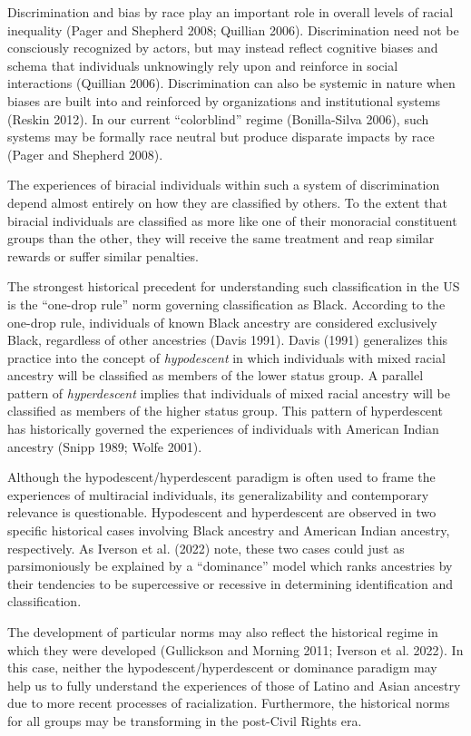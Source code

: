\documentclass[
  letterpaper,
  DIV=11,
  numbers=noendperiod]{scrartcl}
\begin{document}
Discrimination and bias by race play an important role in overall levels
of racial inequality (Pager and Shepherd 2008; Quillian 2006).
Discrimination need not be consciously recognized by actors, but may
instead reflect cognitive biases and schema that individuals unknowingly
rely upon and reinforce in social interactions (Quillian 2006).
Discrimination can also be systemic in nature when biases are built into
and reinforced by organizations and institutional systems (Reskin 2012).
In our current ``colorblind'' regime (Bonilla-Silva 2006), such systems
may be formally race neutral but produce disparate impacts by race
(Pager and Shepherd 2008).

The experiences of biracial individuals within such a system of
discrimination depend almost entirely on how they are classified by
others. To the extent that biracial individuals are classified as more
like one of their monoracial constituent groups than the other, they
will receive the same treatment and reap similar rewards or suffer
similar penalties.

The strongest historical precedent for understanding such classification
in the US is the ``one-drop rule'' norm governing classification as
Black. According to the one-drop rule, individuals of known Black
ancestry are considered exclusively Black, regardless of other
ancestries (Davis 1991). Davis (1991) generalizes this practice into the
concept of \emph{hypodescent} in which individuals with mixed racial
ancestry will be classified as members of the lower status group. A
parallel pattern of \emph{hyperdescent} implies that individuals of
mixed racial ancestry will be classified as members of the higher status
group. This pattern of hyperdescent has historically governed the
experiences of individuals with American Indian ancestry (Snipp 1989;
Wolfe 2001).

Although the hypodescent/hyperdescent paradigm is often used to frame
the experiences of multiracial individuals, its generalizability and
contemporary relevance is questionable. Hypodescent and hyperdescent are
observed in two specific historical cases involving Black ancestry and
American Indian ancestry, respectively. As Iverson et al. (2022) note,
these two cases could just as parsimoniously be explained by a
``dominance'' model which ranks ancestries by their tendencies to be
supercessive or recessive in determining identification and
classification.

The development of particular norms may also reflect the historical
regime in which they were developed (Gullickson and Morning 2011;
Iverson et al. 2022). In this case, neither the hypodescent/hyperdescent
or dominance paradigm may help us to fully understand the experiences of
those of Latino and Asian ancestry due to more recent processes of
racialization. Furthermore, the historical norms for all groups may be
transforming in the post-Civil Rights era.
\end{document}
